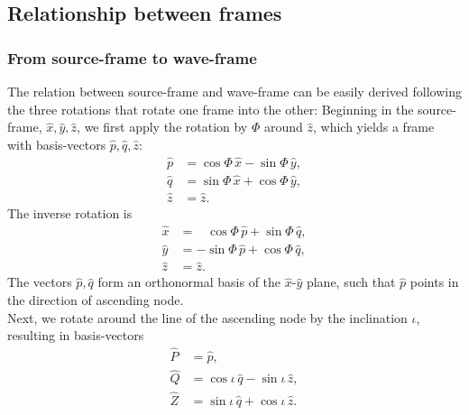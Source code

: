 \documentclass[11pt,tightenlines,article,amssymb,amsmath,amsfonts,superscriptaddress,nofootinbib]{revtex4}
\newcommand{\ExS}{{{\hat x}}}
\newcommand{\EyS}{{{\hat y}}}
\newcommand{\EzS}{{{\hat z}}}
\newcommand{\phiRef}{\Phi} %
\begin{document}
\subsection{Relationship between frames}
\label{sec:Relations}

\subsubsection{From source-frame to wave-frame}

The relation between source-frame and wave-frame can be easily derived
following the three rotations that rotate one frame into the other:
Beginning in the source-frame, $\ExS, \EyS, \EzS$, we first apply the rotation
by $\phiRef$ around $\EzS$, which yields a frame with basis-vectors $\hat p, \hat q, \EzS$:
\begin{subequations}
  \label{eq:phiRef-Rotation1}
\begin{align}
  \hat p &= \cos\phiRef\,\ExS - \sin\phiRef\,\EyS,\\
  \hat q &= \sin\phiRef\,\ExS+\cos\phiRef\,\EyS,\\
  \EzS & = \EzS.
\end{align}
\end{subequations}
The inverse rotation is
\begin{subequations}
  \label{eq:phiRef-Rotation2}
\begin{align}
  \ExS &= \;\;\;\cos\phiRef\,\hat p + \sin\phiRef\,\hat q,\\
  \EyS &= -\sin\phiRef\,\hat p+\cos\phiRef\,\hat q,\\
  \EzS & = \EzS.
\end{align}
\end{subequations}
The vectors $\hat p, \hat q$ form an orthonormal basis of the
$\ExS$-$\EyS$ plane, such that $\hat p$ points in the direction of
ascending node. \\
Next, we rotate around the line of the ascending node by the inclination $\iota$,
resulting in basis-vectors
\begin{subequations}
  \label{eq:iota-Rotation1}
\begin{align}
  \hat P&=\hat p,\\
  \hat Q&=\cos\iota\,\hat q - \sin\iota\,\EzS,\\
  \hat Z&=\sin\iota\,\hat q+\cos\iota\,\EzS.
\end{align}
\end{subequations}
\end{document}
